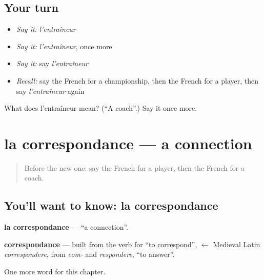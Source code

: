 \subsection*{Your turn}
\begin{itemize}
\raggedright
  \item \emph{Say it:} \emph{l'entraîneur}
  \item \emph{Say it:} \emph{l'entraîneur}, once more
  \item \emph{Say it:} say \emph{l'entraîneur}
  \item \emph{Recall:} say the French for a championship, then the French for a player, then say \emph{l'entraîneur} again
\end{itemize}

\begin{tcolorbox}[breakable,colback=teal!4,colframe=teal!35!black,title={Before you move on}]
What does l'entraîneur mean? (\textquotedblleft{}A coach\textquotedblright{}.) Say it once more.
\end{tcolorbox}
\section[la correspondance]{la correspondance — a connection}

\label{lesson:FR-C203-correspondance}



\begin{quote}
Before the new one: say the French for a player, then the French for a coach.
\end{quote}

\subsection*{You'll want to know: la correspondance}
\textbf{la correspondance} — \textquotedblleft{}a connection\textquotedblright{}.

\begin{cousinweb}
\textbf{correspondance} — built from the verb for \textquotedblleft{}to correspond\textquotedblright{}, $\leftarrow$ Medieval Latin \emph{correspondere}, from \emph{com-} and \emph{respondere}, \textquotedblleft{}to answer\textquotedblright{}.
\end{cousinweb}

\begin{grammarlens}[title={What you've built}]
One more word for this chapter.
\end{grammarlens}

